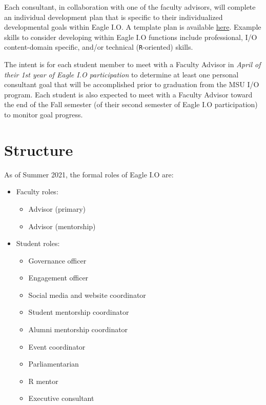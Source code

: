 \documentclass[
]{book}
\providecommand{\tightlist}{%
  \setlength{\itemsep}{0pt}\setlength{\parskip}{0pt}}
\begin{document}
Each consultant, in collaboration with one of the faculty advisors, will complete an individual development plan that is specific to their individualized developmental goals within Eagle I.O. A template plan is available \href{https://docs.google.com/document/d/13OhBJgO4Lr40uA9s3tLBTm17TNRrQa-NJnfTIbSGmT4/edit?usp=sharing}{here}. Example skills to consider developing within Eagle I.O functions include professional, I/O content-domain specific, and/or technical (\texttt{R}-oriented) skills.

The intent is for each student member to meet with a Faculty Advisor in \emph{April of their 1st year of Eagle I.O participation} to determine at least one personal consultant goal that will be accomplished prior to graduation from the MSU I/O program. Each student is also expected to meet with a Faculty Advisor toward the end of the Fall semester (of their second semester of Eagle I.O participation) to monitor goal progress.

\hypertarget{roles}{%
\section{Structure}\label{roles}}

As of Summer 2021, the formal roles of Eagle I.O are:

\begin{itemize}
\tightlist
\item
  Faculty roles:

  \begin{itemize}
  \tightlist
  \item
    Advisor (primary)
  \item
    Advisor (mentorship)
  \end{itemize}
\item
  Student roles:

  \begin{itemize}
  \tightlist
  \item
    Governance officer
  \item
    Engagement officer
  \item
    Social media and website coordinator
  \item
    Student mentorship coordinator
  \item
    Alumni mentorship coordinator\\
  \item
    Event coordinator
  \item
    Parliamentarian
  \item
    R mentor
  \item
    Executive consultant
  \end{itemize}
\end{itemize}
\end{document}
